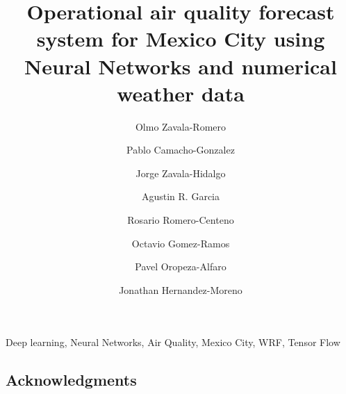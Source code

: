 \documentclass[review,authoryear,5p,times,twocolumn]{elsarticle}
\begin{document}
\begin{frontmatter}

    \title{ Operational air quality forecast system for Mexico City using Neural 
    Networks and numerical weather data}


    \author[unamadd]{ Olmo Zavala-Romero} 
    \author[unamadd]{ Pablo Camacho-Gonzalez} 
    \author[unamadd]{ Jorge Zavala-Hidalgo} 
    \author[unamadd]{ Agustin R. Garcia} 
    \author[unamadd]{ Rosario Romero-Centeno} 
    \author[unamadd]{ Octavio Gomez-Ramos} 
    \author[unamadd]{ Pavel Oropeza-Alfaro} 
    \author[unamadd]{ Jonathan Hernandez-Moreno} 

    \address[unamadd]{Center of Atmospheric Sciences, Universidad Nacional Aut\'onoma de M\'exico}

    

    \begin{keyword}
        Deep learning, Neural Networks, Air Quality, Mexico City, WRF, Tensor Flow
    \end{keyword}

\end{frontmatter}




%




\subsection*{Acknowledgments}



\end{document}
